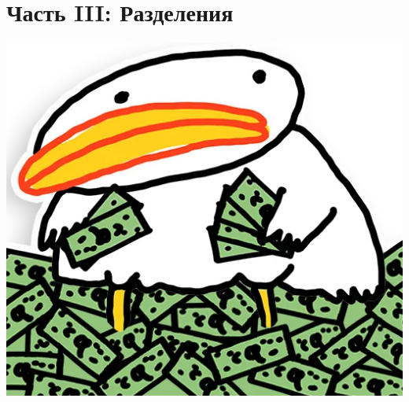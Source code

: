 \section{Часть III: Разделения}

\begin{frame}
    \centering
    \insertsectionhead

    \vspace{0.5cm}
    \includegraphics[scale = 0.2]{pics/utia-money.png}
\end{frame}

